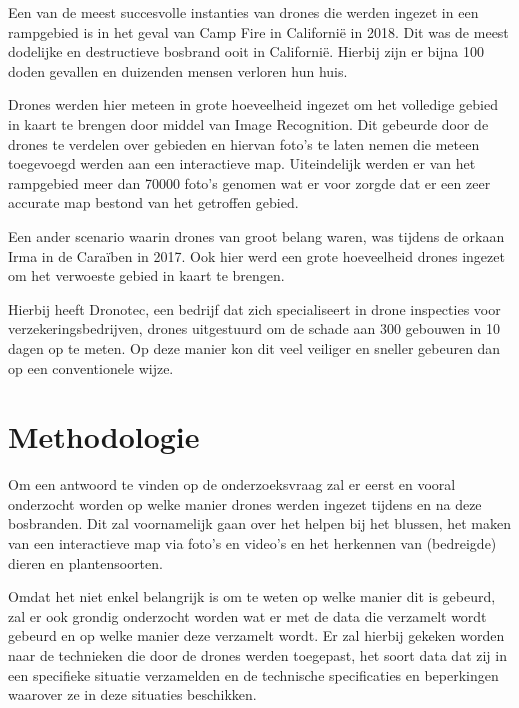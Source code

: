 Een van de meest succesvolle instanties van drones die werden ingezet in een rampgebied is in het geval van Camp Fire in Californië in 2018. Dit was de meest dodelijke en destructieve bosbrand ooit in Californië. Hierbij zijn er bijna 100 doden gevallen en duizenden mensen verloren hun huis.

Drones werden hier meteen in grote hoeveelheid ingezet om het volledige gebied in kaart te brengen door middel van Image Recognition. Dit gebeurde door de drones te verdelen over gebieden en hiervan foto's te laten nemen die meteen toegevoegd werden aan een interactieve map. Uiteindelijk werden er van het rampgebied meer dan 70000 foto's genomen wat er voor zorgde dat er een zeer accurate map bestond van het getroffen gebied. \autocite{Reagan2019}

Een ander scenario waarin drones van groot belang waren, was tijdens de orkaan Irma in de Caraïben in 2017. Ook hier werd een grote hoeveelheid drones ingezet om het verwoeste gebied in kaart te brengen. \autocite{Morant}

Hierbij heeft Dronotec, een bedrijf dat zich specialiseert in drone inspecties voor verzekeringsbedrijven, drones uitgestuurd om de schade aan 300 gebouwen in 10 dagen op te meten. Op deze manier kon dit veel veiliger en sneller gebeuren dan op een conventionele wijze.


\section{Methodologie}
\label{sec:methodologie}

Om een antwoord te vinden op de onderzoeksvraag zal er eerst en vooral onderzocht worden op welke manier drones werden ingezet tijdens en na deze bosbranden. Dit zal voornamelijk gaan over het helpen bij het blussen, het maken van een interactieve map via foto's en video's en het herkennen van (bedreigde) dieren en plantensoorten.

Omdat het niet enkel belangrijk is om te weten op welke manier dit is gebeurd, zal er ook grondig onderzocht worden wat er met de data die verzamelt wordt gebeurd en op welke manier deze verzamelt wordt. Er zal hierbij gekeken worden naar de technieken die door de drones werden toegepast, het soort data dat zij in een specifieke situatie verzamelden en de technische specificaties en beperkingen waarover ze in deze situaties beschikken. 

